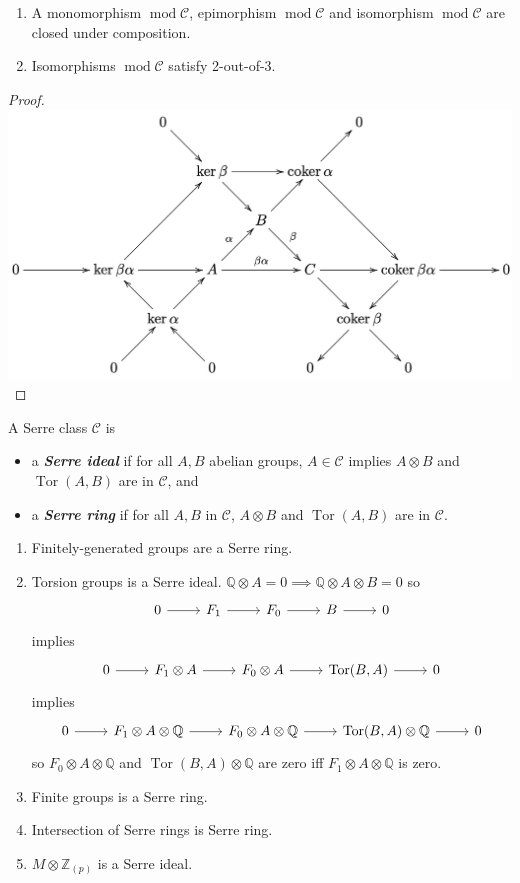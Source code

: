 \documentclass{article}
\newcommand{\Q}{\mathbb{Q}}
\newcommand{\Z}{\mathbb{Z}}
\newcommand{\Cc}{\mathcal{C}}
\DeclareMathOperator{\Tor}{Tor}
\renewcommand{\mod}{\operatorname{mod}}
\begin{document}
\begin{prop}\leavevmode
	\begin{enumerate}
		\item A monomorphism $\mod\Cc$, epimorphism $\mod\Cc$ and isomorphism $\mod\Cc$ are closed under composition.
		\item Isomorphisms $\mod\Cc$ satisfy 2-out-of-3.
	\end{enumerate}
\end{prop}
\begin{proof}\leavevmode
	
	\includegraphics[width=0.9\linewidth]{dgm}
\end{proof}
\begin{defn}
	A Serre class $\Cc$ is 
	\begin{itemize}
		\item a \textbf{\textit{Serre ideal}} if for all $A,B$ abelian groups, $A\in\Cc$ implies $A\otimes B$ and $\Tor(A,B)$ are in $\Cc$, and
		\item a \textbf{\textit{Serre ring}} if for all $A,B$ in $\Cc$, $A\otimes B$ and $\Tor(A,B)$ are in $\Cc$.
	\end{itemize}
\end{defn}
\begin{examples}\leavevmode
	\begin{enumerate}
		\item Finitely-generated groups are a Serre ring.
		\item Torsion groups is a Serre ideal. $\Q\otimes A=0\implies\Q\otimes A\otimes B=0$ so
		\[\begin{tikzcd}
			0\arrow[r]&F_1\arrow[r]&F_0\arrow[r]&B\arrow[r]&0
		\end{tikzcd}\]
		implies
		\[\begin{tikzcd}
			0\arrow[r]&F_1\otimes A\arrow[r]&F_0\otimes A\arrow[r]&\Tor(B,A)\arrow[r]&0
		\end{tikzcd}\]
		implies
		\[\begin{tikzcd}
			0\arrow[r]&F_1\otimes A\otimes\Q\arrow[r]&F_0\otimes A\otimes\Q\arrow[r]&\Tor(B,A)\otimes\Q\arrow[r]&0
		\end{tikzcd}\]
		so $F_0\otimes A\otimes\Q$ and $\Tor(B,A)\otimes\Q$ are zero iff $F_1\otimes A\otimes\Q$ is zero.
		\item Finite groups is a Serre ring.
		\item Intersection of Serre rings is Serre ring.
		\item $M\otimes\Z_{(p)}$ is a Serre ideal.
	\end{enumerate}
\end{examples}
\end{document}
